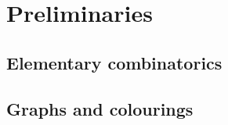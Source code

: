 
\section{Preliminaries}

\subsection{Elementary combinatorics}


\begin{lemma}
  \label{lem:multibounds} %
\end{lemma}

\subsection{Graphs and colourings}


\begin{definition}
  \label{def:complete-graph}
  \leanok
\end{definition}


